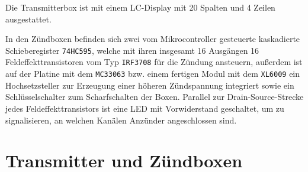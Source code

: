 \documentclass[paper=a4, parskip, numbers=noenddot, toc=listof, headsepline]{scrbook}
\begin{document}
			Die Transmitterbox ist mit einem LC-Display mit 20 Spalten und 4 Zeilen ausgestattet.

			In den Zündboxen befinden sich zwei vom Mikrocontroller gesteuerte kaskadierte Schieberegister \texttt{74HC595}, welche mit ihren insgesamt 16 Ausgängen 16 Feldeffekttransistoren vom Typ \texttt{IRF3708} für die Zündung ansteuern, außerdem ist auf der Platine mit dem \texttt{MC33063} bzw. einem fertigen Modul mit dem \texttt{XL6009} ein Hochsetzsteller zur Erzeugung einer höheren Zündspannung integriert sowie ein Schlüsselschalter zum Scharfschalten der Boxen. Parallel zur Drain-Source-Strecke jedes Feldeffekttransistors ist eine LED mit Vorwiderstand geschaltet, um zu signalisieren, an welchen Kanälen Anzünder angeschlossen sind.



		\section{Transmitter und Zündboxen}
\end{document}
